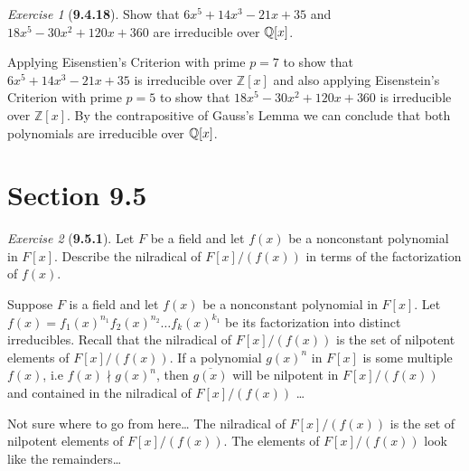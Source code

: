 \documentclass[12pt]{amsart}
\makeatletter
\theoremstyle{remark}
\newtheorem*{exercise}{Exercise}%
\def\ZZ{\ensuremath{\mathbb Z}}
\def\QQ{{\ensuremath\mathbb Q}}
\renewenvironment{proof}[1][\proofname]{\par\doublespacing
  \pushQED{\qed}%
  \normalfont \topsep6\p@\@plus6\p@\relax
  \list{}{%
    \settowidth{\leftmargin}{\itshape\proofname:\hskip\labelsep}%
    \setlength{\labelwidth}{0pt}%
    \setlength{\itemindent}{-\leftmargin}%
  }%
  \item[\hskip\labelsep\itshape#1\@addpunct{:}]\ignorespaces
}{%
  \popQED\endlist\@endpefalse
  \singlespacing
}
\theoremstyle{mycomment}
\makeatother
\begin{document}
    \vspace{.5in}


    \begin{exercise}[\textbf{9.4.18}] Show that $6x^5 + 14x^3 - 21x + 35$ and $18x^5 - 30x^2 + 120x + 360$ are 
      irreducible over $\QQ[x]$.
      \begin{proof}
        Applying Eisenstien's Criterion with prime $p = 7$ to show that $6x^5 + 14x^3 - 21x + 35$ is irreducible over $\ZZ[x]$ and also applying Eisenstein's Criterion with prime $p = 5$ to show that $18x^5 - 30x^2 + 120x + 360$ is irreducible 
        over $\ZZ[x]$. By the contrapositive of Gauss's Lemma we can conclude that both polynomials are irreducible over $\QQ[x]$.
      \end{proof}
      \end{exercise}
      \vspace{.5in}
      
  
  


      \section*{\textbf{Section 9.5}}

\begin{exercise}[\textbf{9.5.1}] Let $F$ be a field and let $f(x)$ be a nonconstant polynomial in $F[x]$. Describe the nilradical of $F[x]/(f(x))$ in terms of the factorization of $f(x)$. 
    \begin{proof} Suppose $F$ is a field and let $f(x)$ be a nonconstant polynomial in $F[x]$. Let $f(x) = f_1(x)^{n_1}f_2(x)^{n_2}\dots f_k(x)^{k_1}$ be its factorization into distinct irreducibles. Recall that the nilradical of $F[x]/(f(x))$ is the set of nilpotent elements of $F[x]/(f(x))$. If a polynomial $g(x)^n$ in $F[x]$ is some multiple $f(x)$, i.e $f(x)\nmid g(x)^n$, then $\overline{g(x)}$ will be  nilpotent in $F[x]/(f(x))$ and contained in the nilradical of $F[x]/(f(x))$ \dots

      Not sure where to go from here\dots
      The nilradical of $F[x]/(f(x))$ is the set of nilpotent elements of $F[x]/(f(x))$.
      The elements of $F[x]/(f(x))$ look like the remainders\dots
      \end{proof}

\end{exercise}
\vspace{.5in}
\end{document}
